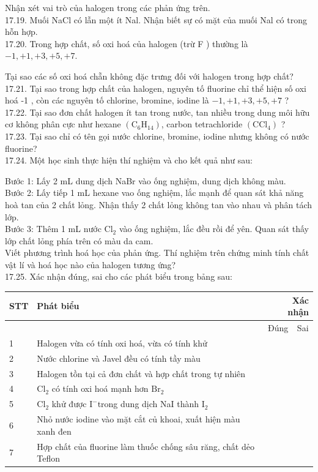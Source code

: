 \documentclass[10pt]{article}
\begin{document}
Nhận xét vai trò của halogen trong các phản ứng trên.\\
17.19. Muối NaCl có lẫn một ít Nal. Nhận biết sự có mặt của muối Nal có trong hỗn hợp.\\
17.20. Trong hợp chất, số oxi hoá của halogen (trừ F ) thường là $-1,+1,+3,+5,+7$.

Tại sao các số oxi hoá chẵn không đặc trưng đối với halogen trong hợp chất?\\
17.21. Tại sao trong hợp chất của halogen, nguyên tố fluorine chỉ thể hiện số oxi hoá -1 , còn các nguyên tố chlorine, bromine, iodine là $-1,+1,+3,+5,+7$ ?\\
17.22. Tại sao đơn chất halogen ít tan trong nước, tan nhiều trong dung môi hữu cơ không phân cực như hexane $\left(\mathrm{C}_{6} \mathrm{H}_{14}\right)$, carbon tetrachloride $\left(\mathrm{CCl}_{4}\right)$ ?\\
17.23. Tại sao chỉ có tên gọi nước chlorine, bromine, iodine nhưng không có nước fluorine?\\
17.24. Một học sinh thực hiện thí nghiệm và cho kết quả như sau:

Bước 1: Lấy 2 mL dung dịch NaBr vào ống nghiệm, dung dịch không màu.\\
Bước 2: Lấy tiếp 1 mL hexane vao ống nghiệm, lắc mạnh để quan sát khả năng hoà tan của 2 chất lỏng. Nhận thấy 2 chất lỏng không tan vào nhau và phân tách lớp.\\
Bước 3: Thêm 1 mL nước $\mathrm{Cl}_{2}$ vào ống nghiệm, lắc đều rồi để yên. Quan sát thấy lớp chất lỏng phía trên có màu da cam.\\
Viết phương trình hoá học của phản ứng. Thí nghiệm trên chứng minh tính chất vật lí và hoá học nào của halogen tương ứng?\\
17.25. Xác nhận đúng, sai cho các phát biểu trong bảng sau:

\begin{center}
\begin{tabular}{|l|l|l|l|}
\hline
\multirow{2}{*}{STT} & \multirow{2}{*}{Phát biểu} & \multicolumn{2}{|r|}{Xác nhận} \\
\hline
 &  & Đúng & Sai \\
\hline
1 & Halogen vừa có tính oxi hoá, vừa có tính khử &  &  \\
\hline
2 & Nước chlorine và Javel đều có tính tầy màu &  &  \\
\hline
3 & Halogen tồn tại cả đơn chất và hợp chất trong tự nhiên &  &  \\
\hline
4 & $\mathrm{Cl}_{2}$ có tính oxi hoá mạnh hơn $\mathrm{Br}_{2}$ &  &  \\
\hline
5 & $\mathrm{Cl}_{2}$ khử được $\mathrm{I}^{-}$trong dung dịch NaI thành $\mathrm{I}_{2}$ &  &  \\
\hline
6 & Nhỏ nước iodine vào mặt cắt củ khoai, xuất hiện màu xanh đen &  &  \\
\hline
7 & Hợp chất của fluorine làm thuốc chống sâu răng, chất dẻo Teflon &  &  \\
\hline
\end{tabular}
\end{center}
\end{document}
